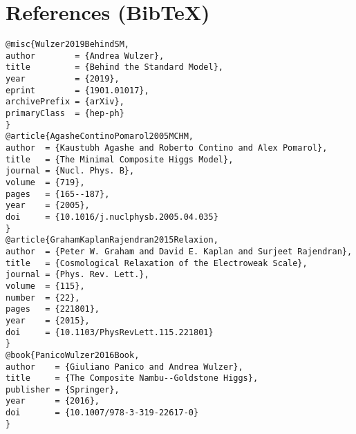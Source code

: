 \documentclass[11pt]{article}
\begin{document}
\section*{References (Bib\TeX)}
\begin{verbatim}
@misc{Wulzer2019BehindSM,
author        = {Andrea Wulzer},
title         = {Behind the Standard Model},
year          = {2019},
eprint        = {1901.01017},
archivePrefix = {arXiv},
primaryClass  = {hep-ph}
}
@article{AgasheContinoPomarol2005MCHM,
author  = {Kaustubh Agashe and Roberto Contino and Alex Pomarol},
title   = {The Minimal Composite Higgs Model},
journal = {Nucl. Phys. B},
volume  = {719},
pages   = {165--187},
year    = {2005},
doi     = {10.1016/j.nuclphysb.2005.04.035}
}
@article{GrahamKaplanRajendran2015Relaxion,
author  = {Peter W. Graham and David E. Kaplan and Surjeet Rajendran},
title   = {Cosmological Relaxation of the Electroweak Scale},
journal = {Phys. Rev. Lett.},
volume  = {115},
number  = {22},
pages   = {221801},
year    = {2015},
doi     = {10.1103/PhysRevLett.115.221801}
}
@book{PanicoWulzer2016Book,
author    = {Giuliano Panico and Andrea Wulzer},
title     = {The Composite Nambu--Goldstone Higgs},
publisher = {Springer},
year      = {2016},
doi       = {10.1007/978-3-319-22617-0}
}
\end{verbatim}




  \ifdefined\standalonechapter\else
  
  
\end{document}
